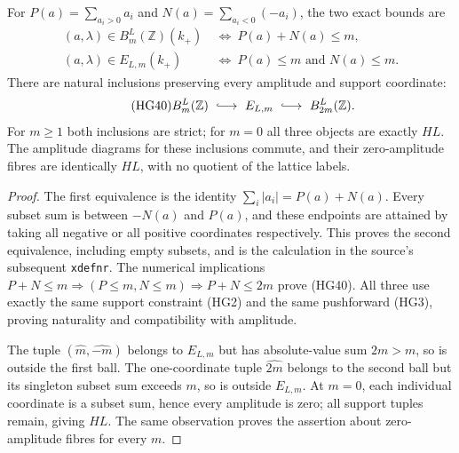 \begin{proposition}\label{HG:twobounds}
For $P(a)=\sum_{a_i>0}a_i$ and
$N(a)=\sum_{a_i<0}(-a_i)$, the two exact bounds are
\begin{equation}\tag{HG39}
 \begin{aligned}
 (a,\lambda)\in B_m^L(\mathbb Z)(k_+)
       &\ \Longleftrightarrow\ P(a)+N(a)\le m,\\
 (a,\lambda)\in E_{L,m}(k_+)
       &\ \Longleftrightarrow\ P(a)\le m\text{ and }N(a)\le m.
 \end{aligned}
\end{equation}
There are natural inclusions preserving every amplitude and
support coordinate:
\begin{equation}\tag{HG40}
 B_m^L(\mathbb Z)\ \lhook\joinrel\longrightarrow\ E_{L,m}
       \ \lhook\joinrel\longrightarrow\ B_{2m}^L(\mathbb Z).
\end{equation}
For $m\ge1$ both inclusions are strict; for $m=0$ all three
objects are exactly $HL$.  The amplitude diagrams for these
inclusions commute, and their zero-amplitude fibres are
identically $HL$, with no quotient of the lattice labels.
\end{proposition}
\begin{proof}
The first equivalence is the identity
$\sum_i|a_i|=P(a)+N(a)$.  Every subset sum is between
$-N(a)$ and $P(a)$, and these endpoints are attained by
taking all negative or all positive coordinates respectively.
This proves the second equivalence, including empty subsets,
and is the calculation in the source's subsequent
\texttt{xdefnr}.  The numerical implications
$P+N\le m\Rightarrow(P\le m,N\le m)\Rightarrow P+N\le2m$
prove (HG40).  All three use exactly the same support
constraint (HG2) and the same pushforward (HG3), proving
naturality and compatibility with amplitude.

The tuple $(\widehat m,\widehat{-m})$ belongs to $E_{L,m}$
but has absolute-value sum $2m>m$, so is outside the first
ball.  The one-coordinate tuple $\widehat{2m}$ belongs to
the second ball but its singleton subset sum exceeds $m$,
so is outside $E_{L,m}$.  At $m=0$, each individual
coordinate is a subset sum, hence every amplitude is zero;
all support tuples remain, giving $HL$.  The same observation
proves the assertion about zero-amplitude fibres for every
$m$.
\end{proof}

